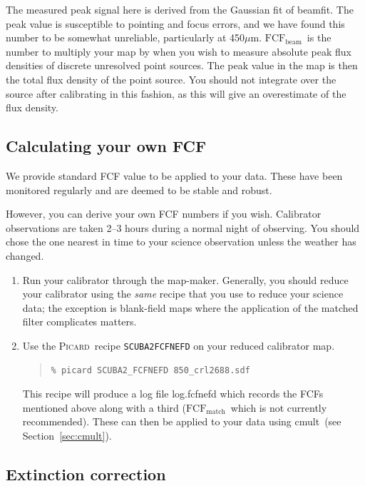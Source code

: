 \documentclass[twoside,11pt]{article}
\newcommand{\xref}[3]{#1}
\newcommand{\xlabel}[1]{}
\renewcommand{\_}{\texttt{\symbol{95}}}
\newenvironment{myquote}{\begin{quote}\begin{small}}{\end{small}\end{quote}}
\newcommand{\fcfb}{$\mathrm{FCF_{beam}}$}
\newcommand{\fcfm}{$\mathrm{FCF_{match}}$}
\newcommand{\picard}{\xref{\textsc{Picard}}{sun265}{}}
\newcommand{\task}[1]{\textsf{#1}}
\newcommand{\beamfit}{\xref{\task{beamfit}}{sun95}{BEAMFIT}}
\newcommand{\cmult}{\xref{\task{cmult}}{sun95}{CMULT}}
\begin{document}
The measured peak signal here is derived from the Gaussian fit of
\beamfit. The peak value is susceptible to pointing and focus errors,
and we have found this number to be somewhat unreliable, particularly
at 450$\mu$m. \fcfb\ is the number to multiply your
map by when you wish to measure absolute peak flux densities of
discrete unresolved point sources. The peak value in the map is then
the total flux density of the point source. You should not integrate
over the source after calibrating in this fashion, as this will give
an overestimate of the flux density.


\subsection{\xlabel{ownfcf}Calculating your own FCF}

We provide standard FCF value to be applied to your data. These have
been monitored regularly and are deemed to be stable and robust.

However, you can derive your own FCF numbers if you wish. Calibrator
observations are taken 2--3 hours during a normal night of observing.
You should chose the one nearest in time to your science observation
unless the weather has changed.

\begin{enumerate}
\item Run your calibrator through the map-maker. Generally, you should
reduce your calibrator using the \emph{same} recipe that you use to
reduce your science data; the exception is blank-field maps where the
application of the matched filter complicates matters.

\item Use the \picard\ recipe \texttt{SCUBA2\_FCFNEFD} on your reduced calibrator map.
\begin{myquote}
\begin{verbatim}
% picard SCUBA2_FCFNEFD 850_crl2688.sdf
\end{verbatim}
\end{myquote}
This recipe will produce a log file log.fcfnefd which records the FCFs
mentioned above along with a third (\fcfm\ which is not currently
recommended). These can then be applied to your data using
\cmult\ (see Section~\ref{sec:cmult}).
\end{enumerate}

\subsection{\xlabel{extinction}Extinction correction}
\end{document}
